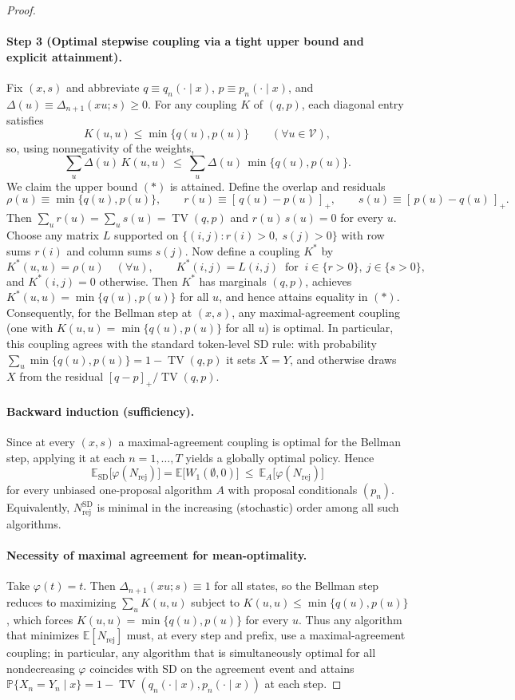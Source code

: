 \begin{proof}
\paragraph{Step 3 (Optimal stepwise coupling via a tight upper bound and explicit attainment).}
Fix $(x,s)$ and abbreviate $q\equiv q_n(\cdot\mid x)$, $p\equiv p_n(\cdot\mid x)$, and $\Delta(u)\equiv \Delta_{n+1}(xu;s)\ge 0$. For any coupling $K$ of $(q,p)$, each diagonal entry satisfies
\[
K(u,u)\le \min\{q(u),p(u)\}\qquad(\forall u\in\mathcal V),
\]
so, using nonnegativity of the weights,
\[
\sum_{u}\Delta(u)\,K(u,u)\ \le\ \sum_{u}\Delta(u)\,\min\{q(u),p(u)\}.\tag{$*$}
\]
We claim the upper bound $(*)$ is attained. Define the overlap and residuals
\[
\rho(u)\equiv \min\{q(u),p(u)\},\qquad r(u)\equiv [\,q(u)-p(u)\,]_+,\qquad s(u)\equiv [\,p(u)-q(u)\,]_+.
\]
Then $\sum_u r(u)=\sum_u s(u)=\operatorname{TV}(q,p)$ and $r(u)\,s(u)=0$ for every $u$. Choose any matrix $L$ supported on $\{(i,j): r(i)>0,\ s(j)>0\}$ with row sums $r(i)$ and column sums $s(j)$. Now define a coupling $K^*$ by
\[
K^*(u,u)=\rho(u)\quad(\forall u),\qquad K^*(i,j)=L(i,j)\ \text{ for }\ i\in\{r>0\},\ j\in\{s>0\},
\]
and $K^*(i,j)=0$ otherwise. Then $K^*$ has marginals $(q,p)$, achieves $K^*(u,u)=\min\{q(u),p(u)\}$ for all $u$, and hence attains equality in $(*)$. Consequently, for the Bellman step at $(x,s)$, any maximal-agreement coupling (one with $K(u,u)=\min\{q(u),p(u)\}$ for all $u$) is optimal. In particular, this coupling agrees with the standard token-level SD rule: with probability $\sum_u \min\{q(u),p(u)\}=1-\operatorname{TV}(q,p)$ it sets $X=Y$, and otherwise draws $X$ from the residual $[q-p]_+/\operatorname{TV}(q,p)$.

\paragraph{Backward induction (sufficiency).}
Since at every $(x,s)$ a maximal-agreement coupling is optimal for the Bellman step, applying it at each $n=1,\dots,T$ yields a globally optimal policy. Hence
\[
\mathbb E_{\mathrm{SD}}\big[\varphi(N_{\mathrm{rej}})\big]=\mathbb E\big[W_1(\emptyset,0)\big]\ \le\ \mathbb E_A\big[\varphi(N_{\mathrm{rej}})\big]
\]
for every unbiased one-proposal algorithm $A$ with proposal conditionals $(p_n)$. Equivalently, $N_{\mathrm{rej}}^{\mathrm{SD}}$ is minimal in the increasing (stochastic) order among all such algorithms.

\paragraph{Necessity of maximal agreement for mean-optimality.}
Take $\varphi(t)=t$. Then $\Delta_{n+1}(xu;s)\equiv 1$ for all states, so the Bellman step reduces to maximizing $\sum_u K(u,u)$ subject to $K(u,u)\le\min\{q(u),p(u)\}$, which forces $K(u,u)=\min\{q(u),p(u)\}$ for every $u$. Thus any algorithm that minimizes $\mathbb E[N_{\mathrm{rej}}]$ must, at every step and prefix, use a maximal-agreement coupling; in particular, any algorithm that is simultaneously optimal for all nondecreasing $\varphi$ coincides with SD on the agreement event and attains $\mathbb P\{X_n=Y_n\mid x\}=1-\operatorname{TV}(q_n(\cdot\mid x),p_n(\cdot\mid x))$ at each step.


\end{proof}
